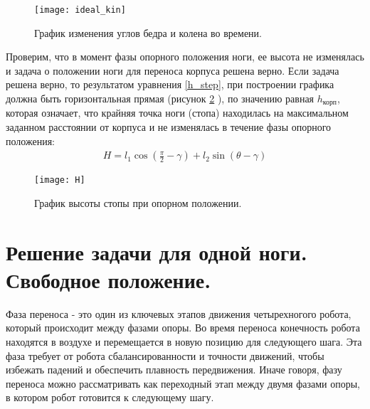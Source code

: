 \begin{figure}[h!]
	\begin{center}
		\texttt{[image: ideal\_kin]}
		\caption{График изменения углов бедра и колена во времени.}
		\label{ideal_kin}
	\end{center}
\end{figure}

\newpage 
Проверим, что в момент фазы опорного положения ноги, ее высота не изменялась и задача о положении ноги для переноса корпуса решена верно. Если задача решена верно, то результатом уравнения \ref{h_step}, при построении графика должна быть горизонтальная прямая (рисунок \ref{H} ), по значению равная $h_{\text{корп}}$, которая означает, что крайняя точка ноги (стопа) находилась на максимальном заданном расстоянии от корпуса и не изменялась в течение фазы опорного положения:
\begin{equation}
	\begin{array}{l}
		H = l_{1}\cos({\frac{\pi}{2}-\gamma}) + l_{2}\sin({\theta-\gamma})
	\end{array}
	\label{h_step}
\end{equation}
\newline
\begin{figure}[h!]
	\begin{center}
		\texttt{[image: H]}
		\caption{График высоты стопы при опорном положении.}
		\label{H}
	\end{center}
\end{figure}
\newpage
\section{Решение задачи для одной ноги. Свободное положение.}\label{C3_3}
Фаза переноса - это один из ключевых этапов движения четырехногого робота, который происходит между фазами опоры. Во время переноса конечность робота находятся в воздухе и перемещается в новую позицию для следующего шага. Эта фаза требует от робота сбалансированности и точности движений, чтобы избежать падений и обеспечить плавность передвижения. Иначе говоря, фазу переноса можно рассматривать как переходный этап между двумя фазами опоры, в котором робот готовится к следующему шагу.

